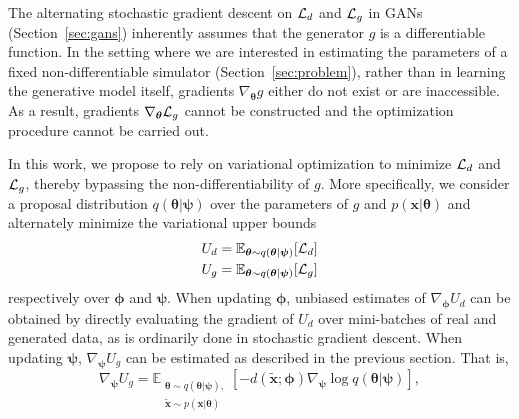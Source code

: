 \documentclass[twocolumn,superscriptaddress,aps]{revtex4-1}
\newcommand{\bftheta}{{\bm \theta}}
\newcommand{\bfpsi}{{\bm \psi}}
\newcommand{\bfphi}{{\bm \phi}}
\newcommand{\bfx}{\mathbf{x}}
\newcommand{\bfz}{\mathbf{z}}
\theoremstyle{plain}
\begin{document}
The alternating stochastic gradient descent on ${\cal L}_d$ and ${\cal L}_g$ in
GANs (Section~\ref{sec:gans}) inherently assumes that the generator $g$ is a differentiable function. In
the setting where we are interested in estimating the parameters of a
fixed non-differentiable simulator (Section~\ref{sec:problem}),
rather than in learning the generative model itself,
gradients $\nabla_\bftheta g$ either do not exist or are inaccessible. As a
result, gradients $\nabla_\bftheta {\cal L}_g$ cannot be constructed and the
optimization procedure cannot be carried out.

In this work, we propose to rely on variational optimization to minimize ${\cal
L}_d$ and ${\cal L}_g$, thereby bypassing the non-differentiability of $g$. More
specifically, we consider a proposal distribution $q(\bftheta|\bfpsi)$ over the
parameters of $g$ and $p(\mathbf{x}|\bftheta)$ and alternately minimize the variational upper bounds
\begin{align}
    U_d &= \mathbb{E}_{\bftheta \sim q(\bftheta|\bfpsi)} [ {\cal L}_d ] \label{eqn:vo-ud} \\
    U_g &= \mathbb{E}_{\bftheta \sim q(\bftheta|\bfpsi)} [ {\cal L}_g ] \label{eqn:vo-ug}
\end{align} respectively over $\bfphi$ and $\bfpsi$.
When updating
$\bfphi$, unbiased estimates of $\nabla_\bfphi U_d$ can be obtained by
directly evaluating the gradient of $U_d$ over mini-batches of real and
generated data, as is ordinarily done in stochastic gradient descent. When updating
$\bfpsi$, $\nabla_\bfpsi U_g$ can be estimated as described in the previous section.
That is,
\begin{equation}\label{eqn:grad-ug-approx}
   \nabla_\bfpsi U_g = \mathbb{E}_{\substack{\bftheta \sim q(\bftheta|\bfpsi), \\ \tilde{\bfx} \sim p(\bfx | \bftheta)}}  [-d( \tilde{\bfx} ;\bfphi) \nabla_\bfpsi \log q(\bftheta|\bfpsi)],
\end{equation} 
\end{document}

